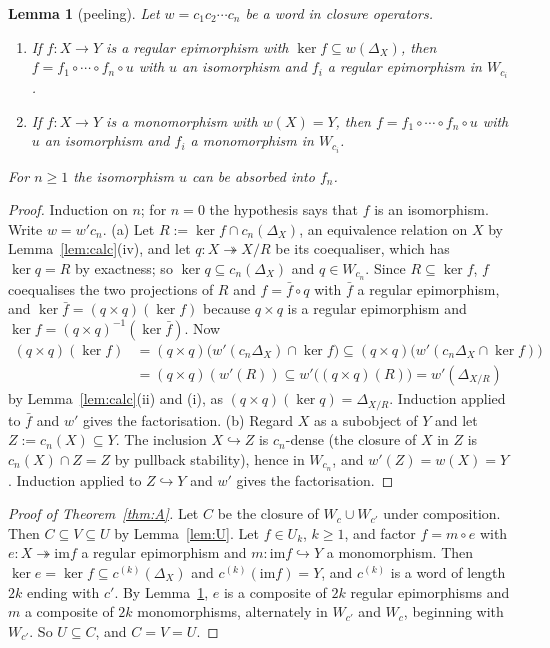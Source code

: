 \documentclass[11pt]{amsart}
\newtheorem{lem}[thm]{Lemma}
\theoremstyle{definition}
\newcommand{\im}{\mathrm{im}}
\begin{document}
\begin{lem}[peeling]\label{lem:peel}
Let $w=c_1c_2\cdots c_n$ be a word in closure operators.
\begin{enumerate}
\item[(a)] If $f\colon X\to Y$ is a regular epimorphism with $\ker f
\subseteq w(\Delta_X)$, then $f=f_1\circ\cdots\circ f_n\circ u$ with $u$ an
isomorphism and $f_i$ a regular epimorphism in $W_{c_i}$.
\item[(b)] If $f\colon X\to Y$ is a monomorphism with $w(X)=Y$, then
$f=f_1\circ\cdots\circ f_n\circ u$ with $u$ an isomorphism and $f_i$ a
monomorphism in $W_{c_i}$.
\end{enumerate}
For $n\ge1$ the isomorphism $u$ can be absorbed into $f_n$.
\end{lem}
\begin{proof}
Induction on $n$; for $n=0$ the hypothesis says that $f$ is an isomorphism.
Write $w=w'c_n$.
(a) Let $R:=\ker f\cap c_n(\Delta_X)$, an equivalence relation on $X$ by
Lemma~\ref{lem:calc}(iv), and let $q\colon X\twoheadrightarrow X/R$ be its
coequaliser, which has $\ker q=R$ by exactness; so $\ker q\subseteq
c_n(\Delta_X)$ and $q\in W_{c_n}$. Since $R\subseteq\ker f$, $f$ coequalises
the two projections of $R$ and $f=\bar f\circ q$ with $\bar f$ a regular
epimorphism, and $\ker\bar f=(q\times q)(\ker f)$ because $q\times q$ is a
regular epimorphism and $\ker f=(q\times q)^{-1}(\ker\bar f)$. Now
\begin{align*}
(q\times q)(\ker f)&=(q\times q)\bigl(w'(c_n\Delta_X)\cap\ker f\bigr)
\subseteq(q\times q)\bigl(w'(c_n\Delta_X\cap\ker f)\bigr)\\
&=(q\times q)(w'(R))\subseteq w'\bigl((q\times q)(R)\bigr)=w'(\Delta_{X/R})
\end{align*}
by Lemma~\ref{lem:calc}(ii) and (i), as $(q\times q)(\ker q)=\Delta_{X/R}$.
Induction applied to $\bar f$ and $w'$ gives the factorisation.
(b) Regard $X$ as a subobject of $Y$ and let $Z:=c_n(X)\subseteq Y$. The
inclusion $X\hookrightarrow Z$ is $c_n$-dense (the closure of $X$ in $Z$ is
$c_n(X)\cap Z=Z$ by pullback stability), hence in $W_{c_n}$, and
$w'(Z)=w(X)=Y$. Induction applied to $Z\hookrightarrow Y$ and $w'$ gives the
factorisation.
\end{proof}

\begin{proof}[Proof of Theorem~\ref{thm:A}]
Let $C$ be the closure of $W_c\cup W_{c'}$ under composition. Then
$C\subseteq V\subseteq U$ by Lemma~\ref{lem:U}. Let $f\in U_k$, $k\ge1$, and
factor $f=m\circ e$ with $e\colon X\twoheadrightarrow\im f$ a regular
epimorphism and $m\colon\im f\hookrightarrow Y$ a monomorphism. Then
$\ker e=\ker f\subseteq c^{(k)}(\Delta_X)$ and $c^{(k)}(\im f)=Y$, and
$c^{(k)}$ is a word of length $2k$ ending with $c'$. By
Lemma~\ref{lem:peel}, $e$ is a composite of $2k$ regular epimorphisms and
$m$ a composite of $2k$ monomorphisms, alternately in $W_{c'}$ and $W_c$,
beginning with $W_{c'}$. So $U\subseteq C$, and $C=V=U$.
\end{proof}
\end{document}
